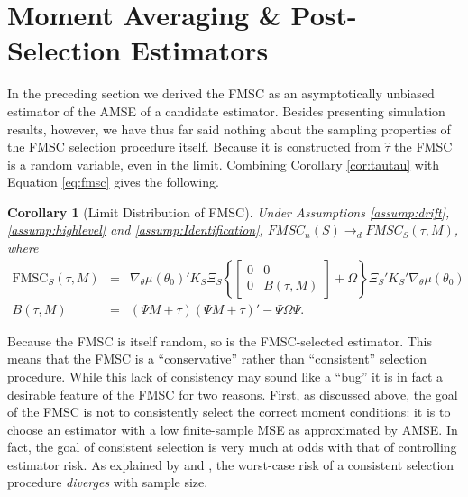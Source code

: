 \documentclass[12pt]{article}
\newtheorem{cor}{Corollary}[section]
\theoremstyle{definition}
\begin{document}
\section{Moment Averaging \& Post-Selection Estimators}
\label{sec:avg}
In the preceding section we derived the FMSC as an asymptotically unbiased estimator of the AMSE of a candidate estimator.
Besides presenting simulation results, however, we have thus far said nothing about the sampling properties of the FMSC selection procedure itself.
Because it is constructed from $\widehat{\tau}$ the FMSC is a random variable, even in the limit.
Combining Corollary \ref{cor:tautau} with Equation \ref{eq:fmsc} gives the following.
\begin{cor}[Limit Distribution of FMSC]
\label{cor:FMSClimit}
	Under Assumptions \ref{assump:drift}, \ref{assump:highlevel} and \ref{assump:Identification}, $FMSC_n(S) \rightarrow_d FMSC_S(\tau, M)$, where
	\begin{eqnarray*}
		\mbox{FMSC}_S(\tau,M) &=& \nabla_\theta\mu(\theta_0)'K_S\Xi_S \left\{\left[\begin{array}{cc}0&0\\0& B(\tau,M) \end{array}\right] + \Omega\right\}\Xi_S'K_S'\nabla_\theta\mu(\theta_0)\\
		B(\tau,M) &=& (\Psi M + \tau)(\Psi M + \tau)' - \Psi \Omega \Psi.
	\end{eqnarray*}
\end{cor}


Because the FMSC is itself random, so is the FMSC-selected estimator.
This means that the FMSC is a ``conservative'' rather than ``consistent'' selection procedure.
While this lack of consistency may sound like a ``bug'' it is in fact a desirable feature of the FMSC for two reasons.
First, as discussed above, the goal of the FMSC is not to consistently select the correct moment conditions: it is to choose an estimator with a low finite-sample MSE as approximated by AMSE.
In fact, the goal of consistent selection is very much at odds with that of controlling estimator risk.
As explained by \cite{Yang2005} and \cite{LeebPoetscher2008}, the worst-case risk of a consistent selection procedure \emph{diverges} with sample size. 
\end{document}
